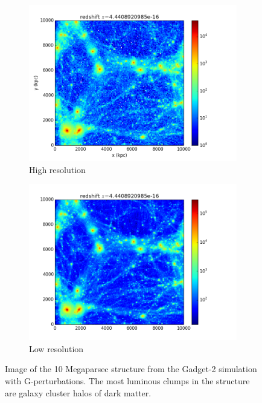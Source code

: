 \begin{figure}
\centering
\begin{subfigure}{.5\textwidth}
  \centering
  \includegraphics[width=1.0\linewidth]{img/Read_ics_1.png}
  \caption{High resolution}
  \label{fig:sub1}
\end{subfigure}%
\begin{subfigure}{.5\textwidth}
  \centering
  \includegraphics[width=1.0\linewidth]{img/Read_ICS_10MPC_1.png}
  \caption{Low resolution}
  \label{fig:sub2}
\end{subfigure}
\caption{Image of the 10 Megaparsec structure from the Gadget-2 simulation with G-perturbations. The most luminous clumps in the structure are galaxy cluster halos of dark matter.}
\label{fig:test}
\end{figure}

